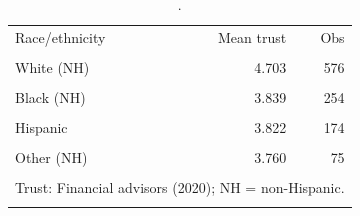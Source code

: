 \begin{table}[htbp]\centering
\caption{.}
\label{tab:trust_mean_by_race_eth_advisors_2020}
\begin{tabular}{lrr}\toprule
Race/ethnicity & Mean trust & Obs \\\\ \midrule
White (NH) & 4.703 & 576 \\\\
Black (NH) & 3.839 & 254 \\\\
Hispanic & 3.822 & 174 \\\\
Other (NH) & 3.760 & 75 \\\\
\bottomrule
\multicolumn{3}{l}{\footnotesize Trust: Financial advisors (2020); NH = non-Hispanic.} \\\\
\end{tabular}
\end{table}
